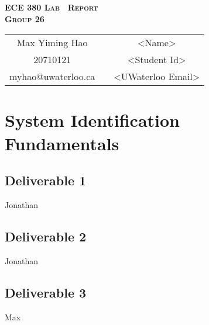 \documentclass[oneside, 12pt]{memoir}
\newcounter{CountOne}
\newcounter{Lab}
\begin{document}
\begin{titlingpage}
    \begin{center}
    
        {\LARGE\bfseries\scshape%
            {ECE 380 Lab \theLab~Report}\\[0.5em]
            Group 26
        }
        
        \vspace{5em}
        
        \begin{tabular}{ccc}
            Max Yiming Hao          &           & <Name>\\
            20710121                &           & <Student Id>\\
            myhao@uwaterloo.ca   &           & <UWaterloo Email>
        \end{tabular}
        
        
        \tableofcontents*
    \end{center}
\end{titlingpage}

\setcounter{chapter}{\the\numexpr\theLab-\theCountOne\relax}

\chapter{System Identification Fundamentals}

\section{Deliverable 1}
Jonathan

\section{Deliverable 2}
Jonathan

\section{Deliverable 3}
Max
\end{document}
